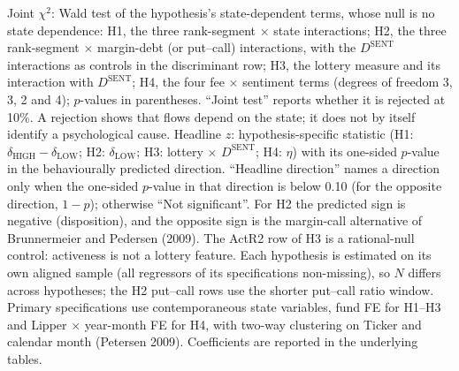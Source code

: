 \begin{table}[!htbp]
\ifdim\tabletempwidth>\linewidth\setlength{\tabletempwidth}{\linewidth}\fi
\begin{minipage}{\tabletempwidth}
\captionsetup{width=\linewidth}
\caption{Behavioral Hypotheses --- Summary of Primary-Spec Test Statistics}\label{tab:behavioral_summary}
\ifdim\wd\tabletempbox>\linewidth
  \resizebox{\linewidth}{!}{\usebox{\tabletempbox}}
\else
  \usebox{\tabletempbox}
\fi
\par\medskip
\begin{singlespace}\tablefont\noindent
Joint $\chi^2$: Wald test of the hypothesis's state-dependent terms, whose null is no state dependence: H1, the three rank-segment $\times$ state interactions; H2, the three rank-segment $\times$ margin-debt (or put--call) interactions, with the $D^{\text{SENT}}$ interactions as controls in the discriminant row; H3, the lottery measure and its interaction with $D^{\text{SENT}}$; H4, the four fee $\times$ sentiment terms (degrees of freedom 3, 3, 2 and 4); $p$-values in parentheses. ``Joint test'' reports whether it is rejected at 10\%. A rejection shows that flows depend on the state; it does not by itself identify a psychological cause. Headline $z$: hypothesis-specific statistic (H1: $\delta_{\text{HIGH}}-\delta_{\text{LOW}}$; H2: $\delta_{\text{LOW}}$; H3: lottery $\times$ $D^{\text{SENT}}$; H4: $\eta$) with its one-sided $p$-value in the behaviourally predicted direction. ``Headline direction'' names a direction only when the one-sided $p$-value in that direction is below 0.10 (for the opposite direction, $1-p$); otherwise ``Not significant''. For H2 the predicted sign is negative (disposition), and the opposite sign is the margin-call alternative of Brunnermeier and Pedersen (2009). The ActR2 row of H3 is a rational-null control: activeness is not a lottery feature. Each hypothesis is estimated on its own aligned sample (all regressors of its specifications non-missing), so $N$ differs across hypotheses; the H2 put--call rows use the shorter put--call ratio window. Primary specifications use contemporaneous state variables, fund FE for H1--H3 and Lipper $\times$ year-month FE for H4, with two-way clustering on Ticker and calendar month (Petersen 2009). Coefficients are reported in the underlying tables.
\end{singlespace}
\end{minipage}
\end{table}

